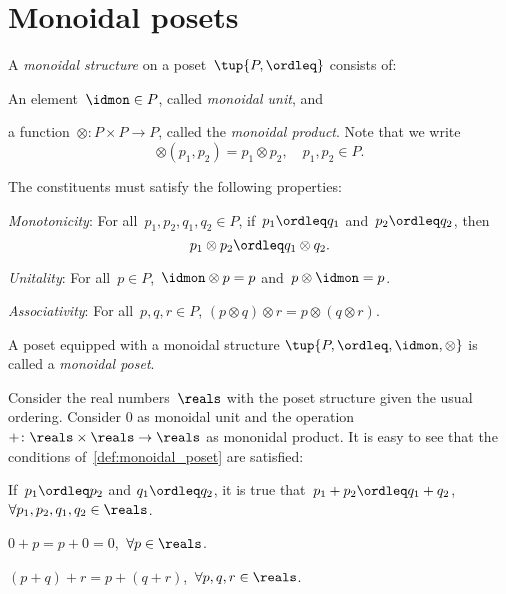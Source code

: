 

\section{Monoidal posets}\label{sec:parallelism-monoidal-posets}

\begin{definition}
    \label{def:monoidal_poset}
    A \emph{monoidal structure} on a poset~$\tup{P,\ordleq}$ consists of:
    \begin{compactenum}
        \item An element~$\idmon\in P$, called \emph{monoidal unit}, and
        \item a function~$\otimes\colon P\times P\to P$, called the \emph{monoidal product}. Note that we write
        \begin{equation*}
            \otimes(p_1,p_2)=p_1\otimes p_2, \quad p_1,p_2\in P.
        \end{equation*}
    \end{compactenum}
    The constituents must satisfy the following properties:
    \begin{compactenum}[(a)]
        \item \emph{Monotonicity}: For all~$p_1,p_2,q_1,q_2\in P$, if~$p_1\ordleq q_1$ and~$p_2\ordleq q_2$, then
        \begin{equation*}
            p_1\otimes p_2\ordleq q_1\otimes q_2.
        \end{equation*}
        \item \emph{Unitality}: For all~$p\in P$,~$\idmon\otimes p=p$ and~$p\otimes \idmon=p$.
        \item \emph{Associativity}: For all~$p,q,r\in P$, $(p\otimes q)\otimes r=p\otimes (q\otimes r)$.
    \end{compactenum}
    A poset equipped with a monoidal structure $\tup{P,\ordleq,\idmon,\otimes}$ is called a \emph{monoidal poset}.
\end{definition}

\begin{example}
    \label{ex:monoidal_pos_reals}
    Consider the real numbers~$\reals$ with the poset structure given the usual ordering. Consider 0 as monoidal unit and the operation~$+\colon \reals\times \reals\to \reals$ as mononidal product. It is easy to see that the conditions of~\cref{def:monoidal_poset} are satisfied:
    \begin{compactenum}[(a)]
        \item If~$p_1\ordleq p_2$ and $q_1\ordleq q_2$, it is true that~$p_1+p_2\ordleq q_1+q_2$,~$\forall p_1,p_2,q_1,q_2\in \reals$.
        \item $0+p=p+0=0$,~$\forall p\in \reals$.
        \item $(p+q)+r=p+(q+r)$,~$\forall p,q,r\in \reals$.
    \end{compactenum}
\end{example}

